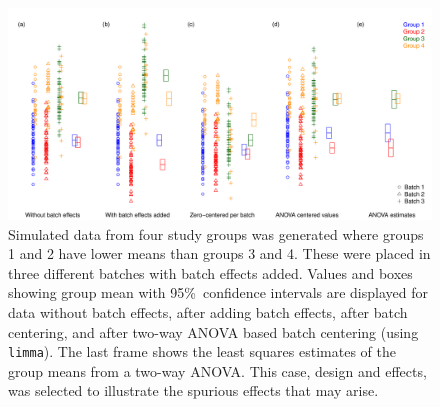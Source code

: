 \documentclass{bio}
\begin{document}
\begin{figure}[!p]
\centering\includegraphics[width=13cm]{Fig/boxplots.pdf}
\caption{Simulated data from four study groups was generated where groups 1 and 2 have lower means than groups 3 and 4. These were placed in three different batches with batch effects added. Values and boxes showing group mean with 95\%~confidence intervals are displayed for data without batch effects, after adding batch effects, after batch centering, and after two-way ANOVA based batch centering (using \texttt{limma}). The last frame shows the least squares estimates of the group means from a two-way ANOVA. This case, design and effects, was selected to illustrate the spurious effects that may arise.
}
\label{fig:boxplots}
\end{figure}
\end{document}
